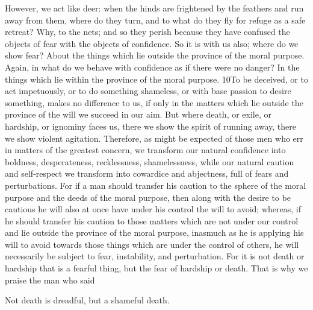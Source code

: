 However, we act like deer: when the hinds are frightened by the feathers and run away from them, where do they turn, and to what do they fly for refuge as a safe retreat? Why, to the nets; and so they perish because they have confused the objects of fear with the objects of confidence. So it is with us also; where do we show fear? About the things which lie outside the province of the moral purpose. Again, in what do we behave with confidence as if there were no danger? In the things which lie within the province of the moral purpose. 10To be deceived, or to act impetuously, or to do something shameless, or with base passion to desire something, makes no difference to us, if only in the matters which lie outside the province of the will we succeed in our aim. But where death, or exile, or hardship, or ignominy faces us, there we show the spirit of running away, there we show violent agitation. Therefore, as might be expected of those men who err in matters of the greatest concern, we transform our natural confidence into boldness, desperateness, recklessness, shamelessness, while our natural caution and self-respect we transform into cowardice and abjectness, full of fears and perturbations. For if a man should transfer his caution to the sphere of the moral purpose and the deeds of the moral purpose, then along with the desire to be cautious he will also at once have under his control the will to avoid; whereas, if he should transfer his caution to those matters which are not under our control and lie outside the province of the moral purpose, inasmuch as he is applying his will to avoid towards those things which are under the control of others, he will necessarily be subject to fear, instability, and perturbation. For it is not death or hardship that is a fearful thing, but the fear of hardship or death. That is why we praise the man who said

Not death is dreadful, but a shameful death.

